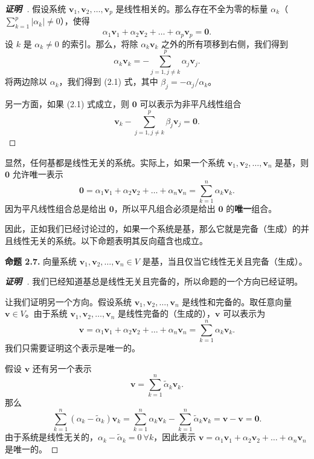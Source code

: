\begin{proof}[\normalfont\bfseries 证明~\nopunct]
 假设系统 $\mathbf{v}_1, \mathbf{v}_2, \dots, \mathbf{v}_p$ 是线性相关的。那么存在不全为零的标量 $\alpha_k$（$\sum_{k=1}^p |\alpha_k| \neq 0$），使得 
$$\alpha_1 \mathbf{v}_1 + \alpha_2 \mathbf{v}_2 + \dots + \alpha_p \mathbf{v}_p = \mathbf{0}.$$
设 $k$ 是 $\alpha_k \neq 0$ 的索引。那么，将除 $\alpha_k \mathbf{v}_k$ 之外的所有项移到右侧，我们得到 $$\alpha_k \mathbf{v}_k = -\sum_{j=1, j \neq k}^p \alpha_j \mathbf{v}_j.$$
将两边除以 $\alpha_k$，我们得到 (2.1) 式，其中 $\beta_j = -\alpha_j / \alpha_k$。

另一方面，如果 (2.1) 式成立，则 $\mathbf{0}$ 可以表示为非平凡线性组合 
$$\mathbf{v}_k - \sum_{j=1, j \neq k}^p \beta_j \mathbf{v}_j = \mathbf{0}.$$
\end{proof}

显然，任何基都是线性无关的系统。实际上，如果一个系统 $\mathbf{v}_1, \mathbf{v}_2, \dots, \mathbf{v}_n$ 是基，则 $\mathbf{0}$ 允许唯一表示 
$$\mathbf{0} = \alpha_1 \mathbf{v}_1 + \alpha_2 \mathbf{v}_2 + \dots + \alpha_n \mathbf{v}_n = \sum_{k=1}^n \alpha_k \mathbf{v}_k.$$
因为平凡线性组合总是给出 $\mathbf{0}$，所以平凡组合必须是给出 $\mathbf{0}$ 的\textbf{唯一}组合。

因此，正如我们已经讨论过的，如果一个系统是基，那么它就是完备（生成）的并且线性无关的系统。以下命题表明其反向蕴含也成立。

\textbf{命题 2.7.} 向量系统 $\mathbf{v}_1, \mathbf{v}_2, \dots, \mathbf{v}_n \in V$ 是基，当且仅当它线性无关且完备（生成）。

\begin{proof}[\normalfont\bfseries 证明~\nopunct]
我们已经知道基总是线性无关且完备的，所以命题的一个方向已经证明。

让我们证明另一个方向。假设系统 $\mathbf{v}_1, \mathbf{v}_2, \dots, \mathbf{v}_n$ 是线性和完备的。取任意向量 $\mathbf{v} \in V$。由于系统 $\mathbf{v}_1, \mathbf{v}_2, \dots, \mathbf{v}_n$ 是线性完备的（生成的），$\mathbf{v}$ 可以表示为 
$$\mathbf{v} = \alpha_1 \mathbf{v}_1 + \alpha_2 \mathbf{v}_2 + \dots + \alpha_n \mathbf{v}_n = \sum_{k=1}^n \alpha_k \mathbf{v}_k.$$
我们只需要证明这个表示是唯一的。

假设 $\mathbf{v}$ 还有另一个表示 $$\mathbf{v} = \sum_{k=1}^n \tilde{\alpha}_k \mathbf{v}_k.$$
那么 
$$\sum_{k=1}^n (\alpha_k - \tilde{\alpha}_k) \mathbf{v}_k = \sum_{k=1}^n \alpha_k \mathbf{v}_k - \sum_{k=1}^n \tilde{\alpha}_k \mathbf{v}_k = \mathbf{v} - \mathbf{v} = \mathbf{0}.$$
由于系统是线性无关的，$\alpha_k - \tilde{\alpha}_k = 0 \ \forall k$，因此表示 $\mathbf{v} = \alpha_1 \mathbf{v}_1 + \alpha_2 \mathbf{v}_2 + \dots + \alpha_n \mathbf{v}_n$ 是唯一的。
\end{proof}

